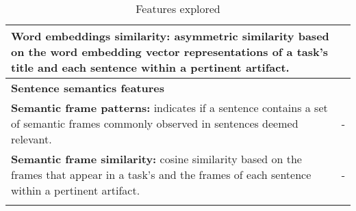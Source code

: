 \begin{table}
\begin{small}
\begin{tabular}{lr}
\parbox[l][1.3cm][c]{11cm}{ 
    \textbf{Word embeddings similarity:} asymmetric similarity based on the word embedding vector representations of a task's title and each sentence within a pertinent artifact.
} & \cite{Xu2017, silva2019} \\  

\hline

\parbox[l][0.5cm][c]{11cm}{
    \textbf{Sentence semantics features}
} &  \\ 

\parbox[l][1cm][c]{11cm}{ 
    \textbf{Semantic frame patterns:} indicates if a sentence contains a set of semantic 
    frames commonly observed in sentences deemed relevant.    
} & - \\  

\parbox[l][1cm][c]{11cm}{ 
    \textbf{Semantic frame similarity:} cosine similarity based on the frames that appear 
    in a task's and the frames of each sentence within a pertinent artifact.
} & - \\  

\hline

\parbox[l][0.5cm][c]{11cm}{ 
} & \\

\end{tabular}
\end{small}
\caption{Features explored}
\label{tbl:approach-textual-features}
\end{table}


